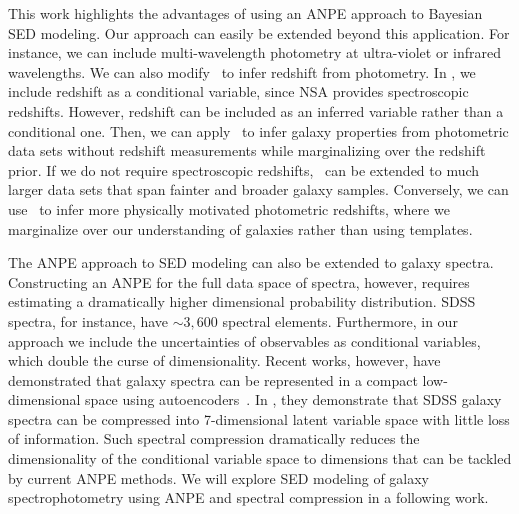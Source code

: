 This work highlights the advantages of using an ANPE approach to Bayesian SED
modeling. 
Our approach can easily be extended beyond this application. 
For instance, we can include multi-wavelength photometry at ultra-violet or
infrared wavelengths. 
We can also modify \sedflow~to infer redshift from photometry. 
In \sedflow, we include redshift as a conditional variable, since NSA provides
spectroscopic redshifts. 
However, redshift can be included as an inferred variable rather than a
conditional one. 
Then, we can apply \sedflow~to infer galaxy properties from photometric data
sets without redshift measurements while marginalizing over the redshift
prior. 
If we do not require spectroscopic redshifts, \sedflow~can be extended to much
larger data sets that span fainter and broader galaxy samples. 
Conversely, we can use \sedflow~to infer more physically motivated photometric 
redshifts, where we marginalize over our understanding of galaxies rather than
using templates. 

The ANPE approach to SED modeling can also be extended to galaxy spectra. 
Constructing an ANPE for the full data space of spectra, however, requires
estimating a dramatically higher dimensional probability distribution. 
SDSS spectra, for instance, have ${\sim}3,600$ spectral elements.  
Furthermore, in our approach we include the uncertainties of observables as
conditional variables, which double the curse of dimensionality.
Recent works, however, have demonstrated that galaxy spectra can be represented
in a compact low-dimensional space using autoencoders~\citep[][Melchior \&
Hahn, in prep.]{portillo2020}.
In \cite{portillo2020}, they demonstrate that SDSS galaxy spectra can be
compressed into 7-dimensional latent variable space with little loss of
information. 
Such spectral compression dramatically reduces the dimensionality of the
conditional variable space to dimensions that can be tackled by current ANPE
methods. 
We will explore SED modeling of galaxy spectrophotometry using ANPE and
spectral compression in a following work. 
